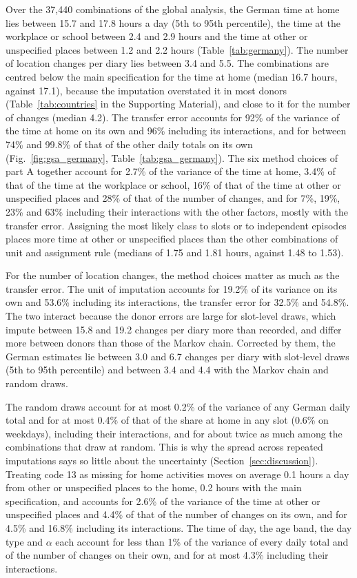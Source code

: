 \documentclass[a4paper]{article}
\begin{document}
Over the 37,440 combinations of the global analysis, the German time at home lies between 15.7 and 17.8 hours a day (5th to 95th percentile), the time at the workplace or school between 2.4 and 2.9 hours and the time at other or unspecified places between 1.2 and 2.2 hours (Table~\ref{tab:germany}). The number of location changes per diary lies between 3.4 and 5.5. The combinations are centred below the main specification for the time at home (median 16.7 hours, against 17.1), because the imputation overstated it in most donors (Table~\ref{tab:countries} in the Supporting Material), and close to it for the number of changes (median 4.2). The transfer error accounts for 92\% of the variance of the time at home on its own and 96\% including its interactions, and for between 74\% and 99.8\% of that of the other daily totals on its own (Fig.~\ref{fig:gsa_germany}, Table~\ref{tab:gsa_germany}). The six method choices of part A together account for 2.7\% of the variance of the time at home, 3.4\% of that of the time at the workplace or school, 16\% of that of the time at other or unspecified places and 28\% of that of the number of changes, and for 7\%, 19\%, 23\% and 63\% including their interactions with the other factors, mostly with the transfer error. Assigning the most likely class to slots or to independent episodes places more time at other or unspecified places than the other combinations of unit and assignment rule (medians of 1.75 and 1.81 hours, against 1.48 to 1.53).

For the number of location changes, the method choices matter as much as the transfer error. The unit of imputation accounts for 19.2\% of its variance on its own and 53.6\% including its interactions, the transfer error for 32.5\% and 54.8\%. The two interact because the donor errors are large for slot-level draws, which impute between 15.8 and 19.2 changes per diary more than recorded, and differ more between donors than those of the Markov chain. Corrected by them, the German estimates lie between 3.0 and 6.7 changes per diary with slot-level draws (5th to 95th percentile) and between 3.4 and 4.4 with the Markov chain and random draws.

The random draws account for at most 0.2\% of the variance of any German daily total and for at most 0.4\% of that of the share at home in any slot (0.6\% on weekdays), including their interactions, and for about twice as much among the combinations that draw at random. This is why the spread across repeated imputations says so little about the uncertainty (Section~\ref{sec:discussion}). Treating code 13 as missing for home activities moves on average 0.1 hours a day from other or unspecified places to the home, 0.2 hours with the main specification, and accounts for 2.6\% of the variance of the time at other or unspecified places and 4.4\% of that of the number of changes on its own, and for 4.5\% and 16.8\% including its interactions. The time of day, the age band, the day type and $\alpha$ each account for less than 1\% of the variance of every daily total and of the number of changes on their own, and for at most 4.3\% including their interactions.
\end{document}

